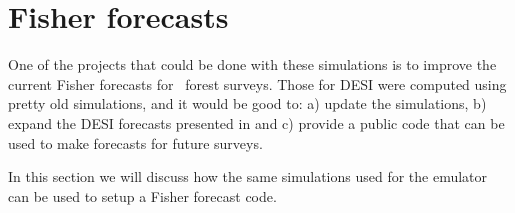 \section{Fisher forecasts} \label{sec:fore}

One of the projects that could be done with these simulations is to improve
the current Fisher forecasts for \lya\ forest surveys.
Those for DESI were computed using pretty old simulations, and it would be
good to: a) update the simulations, b) expand the DESI forecasts presented
in \cite{FontRibera2014} and c) provide a public code that can be used to make
forecasts for future surveys.

In this section we will discuss how the same simulations used for the
emulator can be used to setup a Fisher forecast code.


